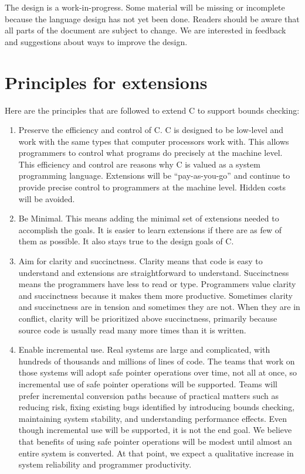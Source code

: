 The design is a work-in-progress.  Some material will be missing
or incomplete because the language design has not yet been done.
Readers should be aware that all parts of the document are subject to change. 
We are interested in feedback and suggestions about ways to improve
the design.

\section{Principles for extensions}
\label{chapter:principles}

Here are the principles that are followed to extend C to support bounds checking:

\begin{enumerate}
\item
  Preserve the efficiency and control of C. C is designed to be
  low-level and work with the same types that computer processors work
  with. This allows programmers to
  control what programs do precisely at the
  machine level. This efficiency and control are reasons why C is valued as a
  system programming language. Extensions will be ``pay-as-you-go'' and
  continue to provide precise control to programmers at the machine
  level. Hidden costs will be avoided.
\item
  Be Minimal. This means adding the minimal set of extensions needed to
  accomplish the goals. It is easier to learn extensions if there are as
  few of them as possible. It also stays true to the design goals
  of C.
\item
  Aim for clarity and succinctness. Clarity means that code is easy to
  understand and extensions are straightforward to understand.
  Succinctness means the programmers have less to read or type.
  Programmers value clarity and succinctness because it makes them more
  productive.  Sometimes clarity and succinctness are in
  tension and sometimes they are not. When they are in conflict, clarity
  will be prioritized above succinctness, primarily because source code
  is usually read many more times than it is written.
\item
  Enable incremental use. Real systems are large and complicated, with
  hundreds of thousands and millions of lines of code. The teams that
  work on those systems will adopt safe pointer operations over time,
  not all at once, so incremental use of safe pointer operations will be
  supported. Teams will prefer incremental conversion paths because of
  practical matters such as reducing risk, fixing existing bugs
  identified by introducing bounds checking, maintaining system
  stability, and understanding performance effects. Even though
  incremental use will be supported, it is not the end goal. We believe
  that benefits of using safe pointer operations will be modest until
  almost an entire system is converted. At that point, we expect a
  qualitative increase in system reliability and programmer
  productivity.
\end{enumerate}


